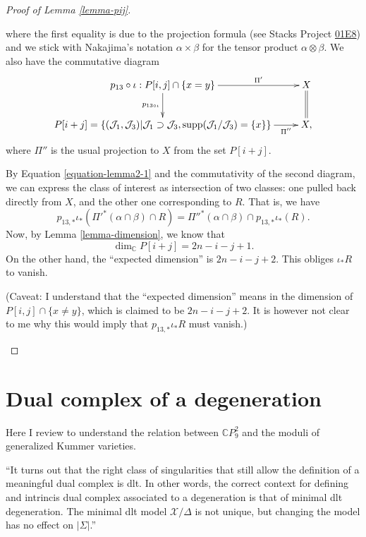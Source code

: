 \begin{proof}[Proof of Lemma \ref{lemma-pij}]
\begin{enumerate}
\noindent
where the first equality is due
to the projection formula
(see Stacks Project
\href{https://stacks.math.columbia.edu/tag/01E8}{01E8})
and we stick with Nakajima's notation
$\alpha \times \beta$
for the tensor product $\alpha \otimes
\beta$.
We also have the commutative diagram
$$
\xymatrix{
p_{13}\circ \iota:P[i,j]\cap\{x=y\}
\ar[r]^-{\Pi'}\ar[d]_{p_{13 \circ
\iota}}&X\ar@{=}[d]\\
P[i+j]=\{(\mathcal{J}_1,\mathcal{J}_3)|\mathcal{J}_1 \supset \mathcal{J}_3,
\text{supp}(\mathcal{J}_1/\mathcal{J}_3)=\{x\}\}\ar[r]_-{\Pi''}&X,
}
$$
where $\Pi''$ is the usual projection to $X$
from the
set $P[i+j]$.

By Equation \ref{equation-lemma2-1}
and the commutativity of the second diagram,
we can express the class of interest as
intersection
of two classes: one pulled back directly
from $X$,
and the other one corresponding to $R$.
That is, we have
$$
p_{13,*}\iota_*({\Pi'}^* (\alpha\cap
\beta)\cap R)
={\Pi''}^* (\alpha \cap \beta)\cap
p_{13,*}\iota_*(R).
$$
Now, by Lemma \ref{lemma-dimension},
we know that
$$
\dim_{\mathbb{C}}P[i+j]=2n-i-j+1.
$$
On the other hand, the ``expected dimension''
is $2n-i-j+2$. This obliges $\iota_*R$ to
vanish.

\medskip\noindent
(Caveat: I understand that the ``expected
dimension''
means in \cite{Nakajima-lectures} the
dimension of
$P[i,j]\cap \{x\neq y\}$, which is claimed
to be
$2n-i-j+2$.
It is however not clear to me why this would
imply
that $p_{13,*}\iota_*R$ must vanish.)

\end{enumerate}
\end{proof}

\section{Dual complex of a degeneration}
\label{section-dual-complex}

\noindent 
Here I review \cite{KLSV} to
understand the relation between
$\mathbb{C}P_9^2$ and the moduli of
generalized Kummer varieties.

``It turns out that the right class of
singularities that still allow the definition
of a meaningful dual complex is dlt. In other
words, the correct context for defining and
intrincis dual complex associated to a
degeneration is that of minimal dlt
degeneration. The minimal dlt model
$\mathcal{X}/\Delta$ is not unique, but
changing the model has no effect on
$|\Sigma|$.''

